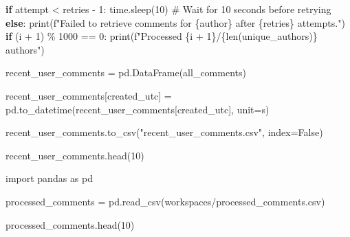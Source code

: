 \documentclass[
  12pt,
  letterpaper,
  DIV=11,
  numbers=noendperiod]{scrartcl}
\newenvironment{Shaded}{\begin{snugshade}}{\end{snugshade}}
\newcommand{\BuiltInTok}[1]{\textcolor[rgb]{0.00,0.23,0.31}{#1}}
\newcommand{\CommentTok}[1]{\textcolor[rgb]{0.37,0.37,0.37}{#1}}
\newcommand{\ControlFlowTok}[1]{\textcolor[rgb]{0.00,0.23,0.31}{\textbf{#1}}}
\newcommand{\DecValTok}[1]{\textcolor[rgb]{0.68,0.00,0.00}{#1}}
\newcommand{\ImportTok}[1]{\textcolor[rgb]{0.00,0.46,0.62}{#1}}
\newcommand{\NormalTok}[1]{\textcolor[rgb]{0.00,0.23,0.31}{#1}}
\newcommand{\OperatorTok}[1]{\textcolor[rgb]{0.37,0.37,0.37}{#1}}
\newcommand{\SpecialCharTok}[1]{\textcolor[rgb]{0.37,0.37,0.37}{#1}}
\newcommand{\SpecialStringTok}[1]{\textcolor[rgb]{0.13,0.47,0.30}{#1}}
\newcommand{\StringTok}[1]{\textcolor[rgb]{0.13,0.47,0.30}{#1}}
\newcommand{\VariableTok}[1]{\textcolor[rgb]{0.07,0.07,0.07}{#1}}
\begin{document}
\begin{Shaded}
\begin{Highlighting}[]
            \ControlFlowTok{if}\NormalTok{ attempt }\OperatorTok{\textless{}}\NormalTok{ retries }\OperatorTok{{-}} \DecValTok{1}\NormalTok{:}
\NormalTok{                time.sleep(}\DecValTok{10}\NormalTok{)  }\CommentTok{\# Wait for 10 seconds before retrying}
            \ControlFlowTok{else}\NormalTok{:}
                \BuiltInTok{print}\NormalTok{(}\SpecialStringTok{f"Failed to retrieve comments for }\SpecialCharTok{\{}\NormalTok{author}\SpecialCharTok{\}}\SpecialStringTok{ after }\SpecialCharTok{\{}\NormalTok{retries}\SpecialCharTok{\}}\SpecialStringTok{ attempts."}\NormalTok{)}
    \ControlFlowTok{if}\NormalTok{ (i }\OperatorTok{+} \DecValTok{1}\NormalTok{) }\OperatorTok{\%} \DecValTok{1000} \OperatorTok{==} \DecValTok{0}\NormalTok{:}
        \BuiltInTok{print}\NormalTok{(}\SpecialStringTok{f"Processed }\SpecialCharTok{\{}\NormalTok{i }\OperatorTok{+} \DecValTok{1}\SpecialCharTok{\}}\SpecialStringTok{/}\SpecialCharTok{\{}\BuiltInTok{len}\NormalTok{(unique\_authors)}\SpecialCharTok{\}}\SpecialStringTok{ authors"}\NormalTok{)}

\NormalTok{recent\_user\_comments }\OperatorTok{=}\NormalTok{ pd.DataFrame(all\_comments)}

\NormalTok{recent\_user\_comments[}\StringTok{\textquotesingle{}created\_utc\textquotesingle{}}\NormalTok{] }\OperatorTok{=}\NormalTok{ pd.to\_datetime(recent\_user\_comments[}\StringTok{\textquotesingle{}created\_utc\textquotesingle{}}\NormalTok{], unit}\OperatorTok{=}\StringTok{\textquotesingle{}s\textquotesingle{}}\NormalTok{)}

\NormalTok{recent\_user\_comments.to\_csv(}\StringTok{"recent\_user\_comments.csv"}\NormalTok{, index}\OperatorTok{=}\VariableTok{False}\NormalTok{)}

\NormalTok{recent\_user\_comments.head(}\DecValTok{10}\NormalTok{)}
\end{Highlighting}
\end{Shaded}

\begin{Shaded}
\begin{Highlighting}[]
\ImportTok{import}\NormalTok{ pandas }\ImportTok{as}\NormalTok{ pd}

\NormalTok{processed\_comments }\OperatorTok{=}\NormalTok{ pd.read\_csv(}\StringTok{\textquotesingle{}workspaces/processed\_comments.csv\textquotesingle{}}\NormalTok{)}

\NormalTok{processed\_comments.head(}\DecValTok{10}\NormalTok{)}
\end{Highlighting}
\end{Shaded}
\end{document}

